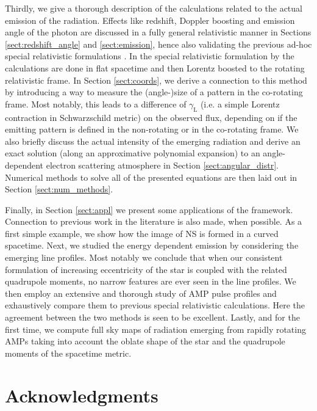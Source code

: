 \documentclass[iop, usenatbib]{emulateapj}
\newcommand{\sch}{Schwarzschild }
\newcommand{\lgamma}{\gamma_{\text{L}}}
\begin{document}
Thirdly, we give a thorough description of the calculations related to the actual emission of the radiation.
Effects like redshift, Doppler boosting and emission angle of the photon are discussed in a fully general relativistic manner in Sections \ref{sect:redshift_angle} and \ref{sect:emission}, hence also validating the previous ad-hoc special relativistic formulations \citep[see e.g.][]{PG03, PB06}.
In the special relativistic formulation by \citealt{PB06} the calculations are done in flat spacetime and then Lorentz boosted to the rotating relativistic frame.
In Section \ref{sect:coords}, we derive a connection to this method by introducing a way to measure the (angle-)size of a pattern in the co-rotating frame.
Most notably, this leads to a difference of $\lgamma$ (i.e. a simple Lorentz contraction in \sch metric) on the observed flux, depending on if the emitting pattern is defined in the non-rotating or in the co-rotating frame.
We also briefly discuss the actual intensity of the emerging radiation and derive an exact solution (along an approximative polynomial expansion) to an angle-dependent electron scattering atmosphere in Section \ref{sect:angular_distr}.
Numerical methods to solve all of the presented equations are then laid out in Section \ref{sect:num_methods}.

Finally, in Section \ref{sect:appl} we present some applications of the framework.
Connection to previous work in the literature is also made, when possible.
As a first simple example, we show how the image of NS is formed in a curved spacetime.
Next, we studied the energy dependent emission by considering the emerging line profiles.
Most notably we conclude that when our consistent formulation of increasing eccentricity of the star is coupled with the related quadrupole moments, no narrow features are ever seen in the line profiles.
We then employ an extensive and thorough study of AMP pulse profiles and exhaustively compare them to previous special relativistic calculations.
Here the agreement between the two methods is seen to be excellent.
Lastly, and for the first time, we compute full sky maps of radiation emerging from rapidly rotating AMPs taking into account the oblate shape of the star and the quadrupole moments of the spacetime metric.



\section*{Acknowledgments}
\end{document}
